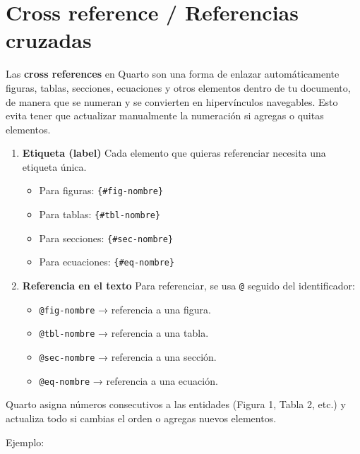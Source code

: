 \documentclass[
  spanish,
  12pt,
  letterpaper,
  DIV=11,
  numbers=noendperiod]{scrreprt}
\providecommand{\tightlist}{%
  \setlength{\itemsep}{0pt}\setlength{\parskip}{0pt}}
\begin{document}
\section{Cross reference / Referencias
cruzadas}\label{cross-reference-referencias-cruzadas-1}

Las \textbf{cross references} en Quarto son una forma de enlazar
automáticamente figuras, tablas, secciones, ecuaciones y otros elementos
dentro de tu documento, de manera que se numeran y se convierten en
hipervínculos navegables. Esto evita tener que actualizar manualmente la
numeración si agregas o quitas elementos.

\begin{enumerate}
\def\labelenumi{\arabic{enumi}.}
\item
  \textbf{Etiqueta (label)} Cada elemento que quieras referenciar
  necesita una etiqueta única.

  \begin{itemize}
  \tightlist
  \item
    Para figuras: \texttt{\{\#fig-nombre\}}
  \item
    Para tablas: \texttt{\{\#tbl-nombre\}}
  \item
    Para secciones: \texttt{\{\#sec-nombre\}}
  \item
    Para ecuaciones: \texttt{\{\#eq-nombre\}}
  \end{itemize}
\item
  \textbf{Referencia en el texto} Para referenciar, se usa \texttt{@}
  seguido del identificador:

  \begin{itemize}
  \tightlist
  \item
    \texttt{@fig-nombre} → referencia a una figura.
  \item
    \texttt{@tbl-nombre} → referencia a una tabla.
  \item
    \texttt{@sec-nombre} → referencia a una sección.
  \item
    \texttt{@eq-nombre} → referencia a una ecuación.
  \end{itemize}
\end{enumerate}

Quarto asigna números consecutivos a las entidades (Figura 1, Tabla 2,
etc.) y actualiza todo si cambias el orden o agregas nuevos elementos.

Ejemplo:
\end{document}
